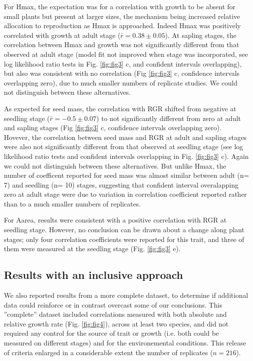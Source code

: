 \documentclass[a4paper,11pt]{article}
\begin{document}
For Hmax, the expectation was for a correlation with growth to be absent for small plants but present at larger sizes, the mechanism being increased relative allocation to reproduction as Hmax is approached. Indeed Hmax was positively correlated with growth at adult stage ($\bar{r}= 0.38 \pm 0.05$). At sapling stages, the correlation between Hmax and growth was not significantly different from that observed at adult stage (model fit not improved when stage was incorporated, see log likelihood ratio tests in Fig. \ref{fig:fig3} c, and confident intervals overlapping), but also was consistent with no correlation (Fig \ref{fig:fig3} c, confidence intervals overlapping zero), due to much smaller numbers of replicate studies. We could not distinguish between these alternatives. 

As expected for seed mass, the correlation with RGR shifted from negative at seedling stage ($\bar{r}= -0.5 \pm 0.07$) to not significantly different from zero at adult and sapling stages (Fig \ref{fig:fig3} c, confidence intervals overlapping zero). Hovever, the correlation between seed mass and RGR at adult and sapling stages were also not significantly different from that observed at seedling stage (see log likelihood ratio tests and confident intervals overlapping in Fig. \ref{fig:fig3} c). Again we could not distinguish between these alternatives. But unlike Hmax, the number of coefficent reported for seed mass was almost similar between adult (n= 7) and seedling (n= 10) stages, suggesting that confident interval overalapping zero at adult stage were due to variation in correlation coefficient reported rather than to a much smaller numbers of replicates. 

For Aarea, results were consistent with a positive correlation with RGR at seedling stage. However, no conclusion can be drawn about a change along plant stages; only four correlation coefficients were reported for this trait, and three of them were measured at the seedling stage (Fig. \ref{fig:fig3} e). 

\subsection*{Results with an inclusive approach}

We also reported results from a more complete dataset, to determine if additional data could reinforce or in contrast overcast some of our conclusions. This ''complete'' dataset included correlations measured with both absolute and relative growth rate (Fig. \ref{fig:fig4}), across at least two species, and did not required any control for the source of trait or growth (i.e. both could be measured on different stages) and for the environemental conditions. This release of criteria enlarged in a considerable extent the number of replicates ($n = 216$). 
\end{document}
